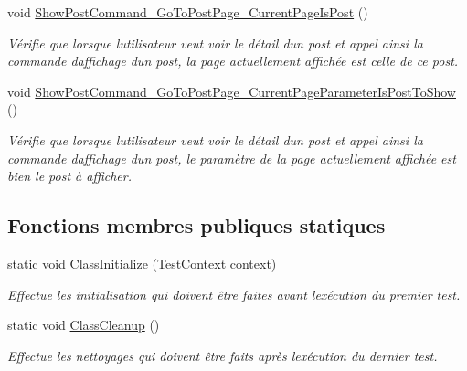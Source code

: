 \begin{DoxyCompactItemize}
void \hyperlink{class_boxes_1_1_tests_1_1_home_view_model_tests_aa78160a21f8b66a83ed7274623d0abcb}{Show\+Post\+Command\+\_\+\+Go\+To\+Post\+Page\+\_\+\+Current\+Page\+Is\+Post} ()
\begin{DoxyCompactList}\small\item\em Vérifie que lorsque l\textquotesingle{}utilisateur veut voir le détail d\textquotesingle{}un post et appel ainsi la commande d\textquotesingle{}affichage d\textquotesingle{}un post, la page actuellement affichée est celle de ce post. \end{DoxyCompactList}\item 
void \hyperlink{class_boxes_1_1_tests_1_1_home_view_model_tests_a2dad74f03a4ec9a258d8c2bc1e8f17fc}{Show\+Post\+Command\+\_\+\+Go\+To\+Post\+Page\+\_\+\+Current\+Page\+Parameter\+Is\+Post\+To\+Show} ()
\begin{DoxyCompactList}\small\item\em Vérifie que lorsque l\textquotesingle{}utilisateur veut voir le détail d\textquotesingle{}un post et appel ainsi la commande d\textquotesingle{}affichage d\textquotesingle{}un post, le paramètre de la page actuellement affichée est bien le post à afficher. \end{DoxyCompactList}\end{DoxyCompactItemize}
\subsection*{Fonctions membres publiques statiques}
\begin{DoxyCompactItemize}
\item 
static void \hyperlink{class_boxes_1_1_tests_1_1_home_view_model_tests_ad36d1ae9e993528529648a43bf1ec5f3}{Class\+Initialize} (Test\+Context context)
\begin{DoxyCompactList}\small\item\em Effectue les initialisation qui doivent être faites avant l\textquotesingle{}exécution du premier test. \end{DoxyCompactList}\item 
static void \hyperlink{class_boxes_1_1_tests_1_1_home_view_model_tests_ada2e3c534138168cb082be5b6155033e}{Class\+Cleanup} ()
\begin{DoxyCompactList}\small\item\em Effectue les nettoyages qui doivent être faits après l\textquotesingle{}exécution du dernier test. \end{DoxyCompactList}\end{DoxyCompactItemize}
